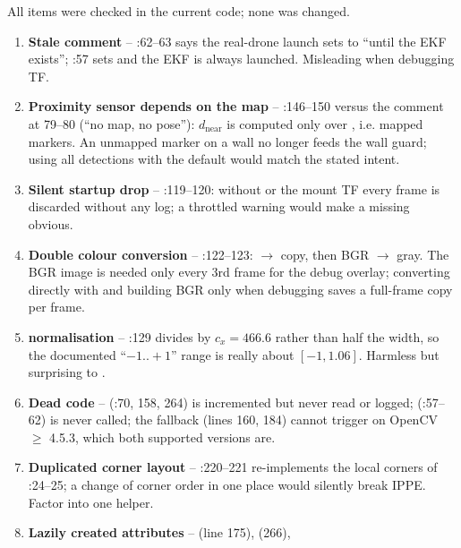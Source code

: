 \begin{review}
All items were checked in the current code; none was changed.
\begin{enumerate}
\item \textbf{Stale comment} -- :62--63 says the real-drone launch sets 
  to  ``until the EKF exists''; :57 sets  and the EKF is
  always launched. Misleading when debugging TF.
\item \textbf{Proximity sensor depends on the map} -- :146--150 versus the comment at 79--80
  (``no map, no pose''): $d_{\text{near}}$ is computed only over , i.e. mapped markers. An unmapped marker on a wall no longer feeds the wall guard; using
  all detections with the default  would match the stated intent.
\item \textbf{Silent startup drop} -- :119--120: without  or the mount TF
  every frame is discarded without any log; a throttled warning would make a missing 
  obvious.
\item \textbf{Double colour conversion} -- :122--123:  $\to$  copy, then
  BGR $\to$ gray. The BGR image is needed only every 3rd frame for the debug overlay; converting  directly
  with  and building BGR only when debugging saves a full-frame copy per frame.
\item \textbf{ normalisation} -- :129 divides by $c_x=466.6$ rather than half the
  width, so the documented ``$-1..+1$'' range is really about $[-1, 1.06]$. Harmless but surprising to .
\item \textbf{Dead code} --  (:70, 158, 264) is incremented but never read
  or logged;  (:57--62) is never called; the
   fallback (lines 160, 184) cannot trigger on OpenCV $\geq$ 4.5.3, which both supported
  versions are.
\item \textbf{Duplicated corner layout} -- :220--221 re-implements the local corners of
  :24--25; a change of corner order in one place would silently break IPPE. Factor into one helper.
\item \textbf{Lazily created attributes} --  (line 175),  (266), 

\end{enumerate}
\end{review}
